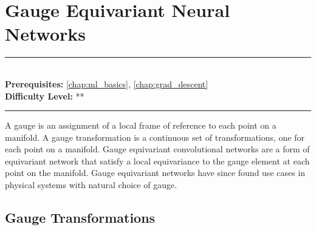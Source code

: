 \documentclass[book.tex]{subfiles}
\begin{document}
\chapter{Gauge Equivariant Neural Networks}
\label{chap:gauge_equivariant_networks}
\noindent\rule{11cm}{0.4pt} \\
\textbf{Prerequisites:}  \autoref{chap:ml_basics}, \autoref{chap:grad_descent}  \\
\textbf{Difficulty Level:} ** \\
\noindent\rule{11cm}{0.4pt}
\vspace{5mm}




A gauge is an assignment of a local frame of reference to each point on a manifold. A gauge transformation is a continuous set of transformations, one for each point on a manifold. Gauge equivariant convolutional networks\cite{cohen2019gauge} are a form of equivariant network that satisfy a local equivariance to the gauge element at each point on the manifold. Gauge equivariant networks have since found use cases in physical systems with natural choice of gauge.

\section{Gauge Transformations}
\end{document}
